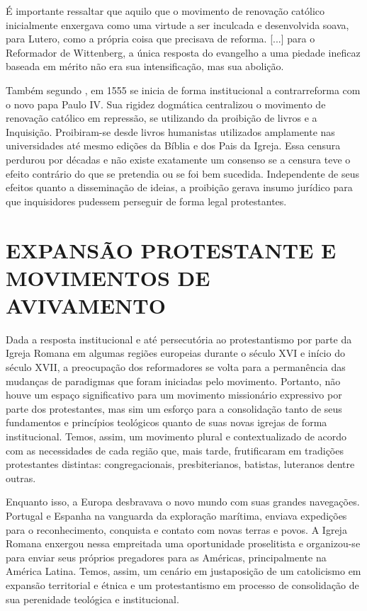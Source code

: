 \documentclass[
    article,            %
	12pt,				%
	oneside,			%
	a4paper,			%
	chapter=TITLE,		%
	section=TITLE,		%
	english,			%
	french,				%
	spanish,			%
	brazil				%
	]{abntex2}
\begin{document}
\begin{citacao}
É importante ressaltar que aquilo que o movimento de renovação católico inicialmente enxergava como uma virtude a ser inculcada e desenvolvida soava, para Lutero, como a própria coisa que precisava de reforma. [...] para o Reformador de Wittenberg, a única resposta do evangelho a uma piedade ineficaz baseada em mérito não era sua intensificação, mas sua abolição.
\end{citacao}

Também segundo , em 1555 se inicia de forma institucional a contrarreforma com o novo papa Paulo IV. Sua rigidez dogmática centralizou o movimento de renovação católico em repressão, se utilizando da proibição de livros e a Inquisição. Proibiram-se desde livros humanistas utilizados amplamente nas universidades até mesmo edições da Bíblia e dos Pais da Igreja. Essa censura perdurou por décadas e não existe exatamente um consenso se a censura teve o efeito contrário do que se pretendia ou se foi bem sucedida. Independente de seus efeitos quanto a disseminação de ideias, a proibição gerava insumo jurídico para que inquisidores pudessem perseguir de forma legal protestantes.

\section{EXPANSÃO PROTESTANTE E MOVIMENTOS DE AVIVAMENTO}
Dada a resposta institucional e até persecutória ao protestantismo por parte da Igreja Romana em algumas regiões europeias durante o século XVI e início do século XVII, a preocupação dos reformadores se volta para a permanência das mudanças de paradigmas que foram iniciadas pelo movimento. Portanto, não houve um espaço significativo para um movimento missionário expressivo por parte dos protestantes, mas sim um esforço para a consolidação tanto de seus fundamentos e princípios teológicos quanto de suas novas igrejas de forma institucional. Temos, assim, um movimento plural e contextualizado de acordo com as necessidades de cada região que, mais tarde, frutificaram em tradições protestantes distintas: congregacionais, presbiterianos, batistas, luteranos dentre outras.

Enquanto isso, a Europa desbravava o novo mundo com suas grandes navegações. Portugal e Espanha na vanguarda da exploração marítima, enviava expedições para o reconhecimento, conquista e contato com novas terras e povos. A Igreja Romana enxergou nessa empreitada uma oportunidade proselitista e organizou-se para enviar seus próprios pregadores para as Américas, principalmente na América Latina. Temos, assim, um cenário em justaposição de um catolicismo em expansão territorial e étnica e um protestantismo em processo de consolidação de sua perenidade teológica e institucional.
\end{document}
